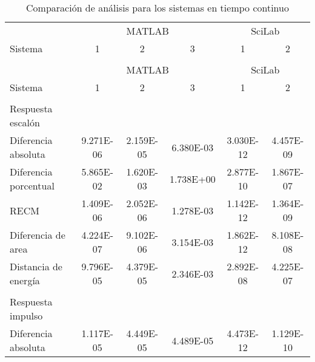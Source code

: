        {\setlength\LTleft{0pt}
        \setlength\LTright{0pt}
        \scriptsize
        \centering
        \renewcommand{\arraystretch}{0.87}
        \begin{longtable}{l @{\extracolsep{\fill}} ccccc}
            \caption[Comparación de análisis - tiempo continuo]{Comparación de análisis para los sistemas en tiempo continuo}
            \label{tab:AnalisisStepC} \\
            \toprule
                    & \multicolumn{3}{c}{MATLAB} & \multicolumn{2}{c}{SciLab}\\ \cmidrule{2-4}\cmidrule{5-6}
            Sistema &    1    &    2    &    3   &     1       &       2     \\ \cmidrule{2-2}\cmidrule{3-3}\cmidrule{4-4}\cmidrule{5-5}\cmidrule{6-6}
            & & & & & \\
            \endfirsthead
            \toprule
                    & \multicolumn{3}{c}{MATLAB} & \multicolumn{2}{c}{SciLab}\\ \cmidrule{2-4}\cmidrule{5-6}
            Sistema &    1    &    2    &    3   &     1       &       2     \\ \cmidrule{2-2}\cmidrule{3-3}\cmidrule{4-4}\cmidrule{5-5}\cmidrule{6-6}
            & & & & & \\
            \endhead
            \bottomrule
            \endfoot
            Respuesta escalón      &  &  &  &  & \\ \cmidrule{1-1}
            Diferencia absoluta    & \num{9.271E-06} & \num{2.159E-05} & \num{6.380E-03} & \num{3.030E-12} & \num{4.457E-09}  \\
            Diferencia porcentual  & \num{5.865E-02} & \num{1.620E-03} & \num{1.738E+00} & \num{2.877E-10} & \num{1.867E-07}  \\
            RECM                   & \num{1.409E-06} & \num{2.052E-06} & \num{1.278E-03} & \num{1.142E-12} & \num{1.364E-09}  \\
            Diferencia de area     & \num{4.224E-07} & \num{9.102E-06} & \num{3.154E-03} & \num{1.862E-12} & \num{8.108E-08}  \\
            Distancia de energía   & \num{9.796E-05} & \num{4.379E-05} & \num{2.346E-03} & \num{2.892E-08} & \num{4.225E-07}  \\
            & & & & & \\
            Respuesta impulso      &  &  &  &  & \\ \cmidrule{1-1}
            Diferencia absoluta    & \num{1.117E-05} & \num{4.449E-05} & \num{4.489E-05} & \num{4.473E-12} & \num{1.129E-10}  \\

\end{longtable}}
